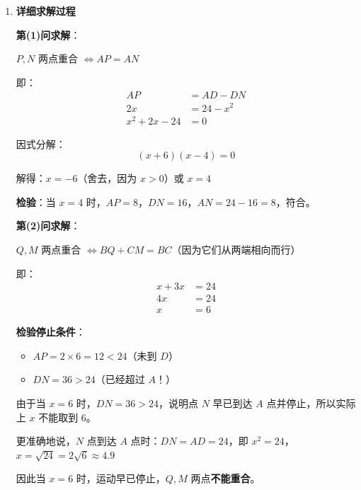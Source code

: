 \documentclass[UTF8]{ctexart}
\newenvironment{redenv}{\color{red}}{}
\newenvironment{detailedanalysis}{%
    \color{red}
    \begin{enumerate}[label=\textbf{第\arabic*步：}, leftmargin=*, align=left, itemsep=1.5ex]
}{%
    \end{enumerate}
}
\begin{document}
\begin{redenv}
\begin{detailedanalysis}
由图可知，$PQ$ 和 $NM$ 是两条连线。若 $PQ \parallel NM$ 且 $PQ = NM$，则四边形为平行四边形。

由于 $P, N$ 在 $AD$ 上，$Q, M$ 在 $BC$ 上，且 $AD \parallel BC$，所以只要 $PN$ 和 $QM$ 的中点重合（或对角线互相平分），即可判定为平行四边形。

更简便的方法：由于 $PQNM$ 的顶点分别在平行的两边上，只需满足 $PN = QM$（上下两边平行且相等）。

注意：$PN = |AP - AN|$ 或 $PN = |AD - AP - DN|$，具体取决于位置。

实际上，$P$ 在 $A$ 和 $N$ 之间还是 $N$ 在 $A$ 和 $P$ 之间需要讨论。

\item \textbf{详细求解过程}

\noindent\textbf{第(1)问求解}：

$P, N$ 两点重合 $\Leftrightarrow AP = AN$

即：
\begin{align*}
AP &= AD - DN \\
2x &= 24 - x^2 \\
x^2 + 2x - 24 &= 0
\end{align*}

因式分解：
\[
(x + 6)(x - 4) = 0
\]

解得：$x = -6$（舍去，因为 $x > 0$）或 $x = 4$

\textbf{检验}：当 $x = 4$ 时，$AP = 8$，$DN = 16$，$AN = 24 - 16 = 8$，符合。

\noindent\textbf{第(2)问求解}：

$Q, M$ 两点重合 $\Leftrightarrow BQ + CM = BC$（因为它们从两端相向而行）

即：
\begin{align*}
x + 3x &= 24 \\
4x &= 24 \\
x &= 6
\end{align*}

\textbf{检验停止条件}：
\begin{itemize}
    \item $AP = 2 \times 6 = 12 < 24$（未到 $D$）
    \item $DN = 36 > 24$（已经超过 $A$！）
\end{itemize}

由于当 $x = 6$ 时，$DN = 36 > 24$，说明点 $N$ 早已到达 $A$ 点并停止，所以实际上 $x$ 不能取到 6。

更准确地说，$N$ 点到达 $A$ 点时：$DN = AD = 24$，即 $x^2 = 24$，$x = \sqrt{24} = 2\sqrt{6} \approx 4.9$

因此当 $x = 6$ 时，运动早已停止，$Q, M$ 两点\textbf{不能重合}。


\end{detailedanalysis}
\end{redenv}
\end{document}

